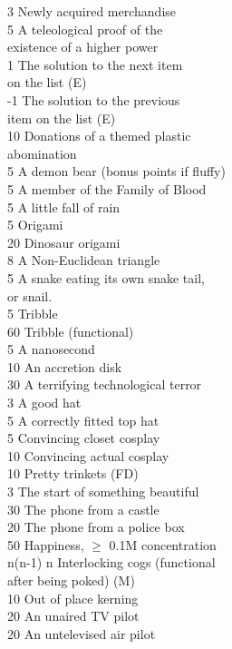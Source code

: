 \begin{multicols}{2}
\begin{tabbing}
3   \> Newly acquired merchandise  \\
5   \> A teleological proof of the\\ \> existence of a higher power \\
1   \> The solution to the next item \\ \> on the list (E) \\
-1  \> The solution to the previous \\ \> item on the list (E)\\
10  \> Donations of a themed plastic \\ \> abomination \\
5   \> A demon bear (bonus points if fluffy) \\
5   \> A member of the Family of Blood \\
5   \> A little fall of rain \\
5	\> Origami \\
20  \> Dinosaur origami \\
8	\> A Non-Euclidean triangle \\
5   \> A snake eating its own snake tail, \\ \> or snail.\\
5	\> Tribble \\
60	\> Tribble (functional) \\
5	\> A nanosecond \\
10  \> An accretion disk \\
30  \> A terrifying technological terror \\
3	\> A good hat \\
5	\> A correctly fitted top hat \\
5   \> Convincing closet cosplay \\
10  \> Convincing actual cosplay \\
10  \> Pretty trinkets (FD) \\
3   \> The start of something beautiful \\
30   \> The phone from a castle \\
20  \> The phone from a police box \\
50	\> Happiness, $\ge$ 0.1M concentration \\
n(n-1)	\> n Interlocking cogs (functional \\ \> after being poked) (M) \\
10   \> Out of place kerning \\
20   \> An unaired TV pilot \\
20   \> An untelevised air pilot \\

\end{tabbing}
\end{multicols}
